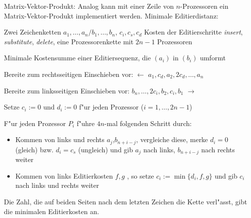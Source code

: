 \remark Matrix-Vektor-Produkt:{
  Analog kann mit einer Zeile von $n$-Prozessoren ein Matrix-Vektor-Produkt
  implementiert werden.
}
\algorithm Minimale Editierdistanz:{
  \given Zwei Zeichenketten $a_1,\ldots,a_n/b_1,\ldots,b_n$, $c_i,c_s,c_d$
    Kosten der Editierschritte \textit{insert}, \textit{substitute},
    \textit{delete}, eine Prozessorenkette mit $2n-1$ Prozessoren
    
  \aim Minimale Kostensumme einer Editiersequenz, die $(a_i)$ in $(b_i)$ umformt
  
  \begin{proc}
    \item Bereite zum rechtsseitigen Einschieben vor:
      $\leftarrow$ $a_1,c_d,a_2,2c_d,\ldots,a_n$
    \item Bereite zum linksseitigen Einschieben vor: 
      $b_n,\ldots,2c_i,b_2,c_i,b_1$ $\rightarrow$
    \item Setze $c_i:=0$ und $d_i:=0$ f"ur jeden Prozessor ($i=1,\ldots,2n-1$)
    \item F"ur jeden Prozessor $P_i$ f"uhre $4n$-mal folgenden Schritt durch:
      \begin{itemize}
        \item Kommen von links und rechts $a_j$,$b_{n+i-j}$, vergleiche diese,
	  merke $d_i=0$ (gleich) bzw. $d_i=c_s$ (ungleich) und gib $a_j$ nach
	  links, $b_{n+i-j}$ nach rechts weiter
	\item Kommen von links Editierkosten $f,g$ , so setze 
	  $c_i:=\min\{d_i,f,g\}$ und gib $c_i$ nach links und rechts weiter
      \end{itemize}
    \item Die Zahl, die auf beiden Seiten nach dem letzten Zeichen die Kette
      verl"asst, gibt die minimalen Editierkosten an.      
  \end{proc}
}

